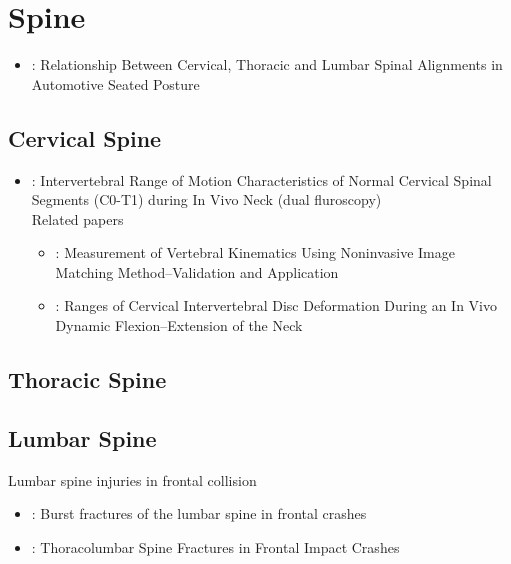 \documentclass[]{book}
\providecommand{\tightlist}{%
  \setlength{\itemsep}{0pt}\setlength{\parskip}{0pt}}
\begin{document}
\hypertarget{spine}{%
\chapter{Spine}\label{spine}}

\begin{itemize}
\tightlist
\item
  \citet{Sato2019}: Relationship Between Cervical, Thoracic and Lumbar Spinal Alignments in Automotive Seated Posture
\end{itemize}

\hypertarget{cervical-spine}{%
\section{Cervical Spine}\label{cervical-spine}}

\begin{itemize}
\tightlist
\item
  \citet{Zhou2019} : Intervertebral Range of Motion Characteristics of Normal Cervical Spinal Segments (C0-T1) during In Vivo Neck (dual fluroscopy)\\
  Related papers

  \begin{itemize}
  \tightlist
  \item
    \citet{Wang2008}: Measurement of Vertebral Kinematics Using Noninvasive Image Matching Method--Validation and Application
  \item
    \citet{Yu2017}: Ranges of Cervical Intervertebral Disc Deformation During an In Vivo Dynamic Flexion--Extension of the Neck
  \end{itemize}
\end{itemize}

\hypertarget{thoracic-spine}{%
\section{Thoracic Spine}\label{thoracic-spine}}

\hypertarget{lumbar-spine}{%
\section{Lumbar Spine}\label{lumbar-spine}}

Lumbar spine injuries in frontal collision

\begin{itemize}
\item
  \citet{Kaufman2013}: Burst fractures of the lumbar spine in frontal crashes
\item
  \citet{Pintar2012}: Thoracolumbar Spine Fractures in Frontal Impact Crashes
\end{itemize}
\end{document}
